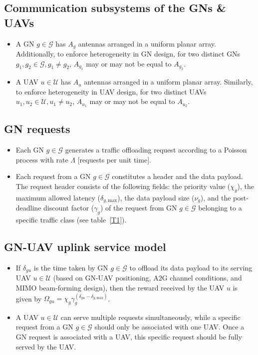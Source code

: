 \documentclass{article}
\begin{document}
\subsection{Communication subsystems of the GNs \& UAVs}
\begin{itemize}
    \item A GN $g{\in}\mathcal{G}$ has $A_{g}$ antennas arranged in a uniform planar array. Additionally, to enforce heterogeneity in GN design, for two distinct GNs $g_{1},g_{2}{\in}\mathcal{G},g_{1}{\neq}g_{2}$, $A_{g_{1}}$ may or may not be equal to $A_{g_{2}}$.
    \item A UAV $u{\in}\mathcal{U}$ has $A_{u}$ antennas arranged in a uniform planar array. Similarly, to enforce heterogeneity in UAV design, for two distinct UAVs $u_{1},u_{2}{\in}\mathcal{U},u_{1}{\neq}u_{2}$, $A_{u_{1}}$ may or may not be equal to $A_{u_{2}}$.
\end{itemize}

\subsection{GN requests}
\begin{itemize}
    \item Each GN $g{\in}\mathcal{G}$ generates a traffic offloading request according to a Poisson process with rate $\Lambda$ [requests per unit time].
    \item Each request from a GN $g{\in}\mathcal{G}$ constitutes a header and the data payload. The request header consists of the following fields: the priority value ($\chi_{g}$), the maximum allowed latency ($\delta_{g,\mathrm{max}}$), the data payload size ($\nu_{g}$), and the post-deadline discount factor ($\gamma_{g}$) of the request from GN $g{\in}\mathcal{G}$ belonging to a specific traffic class (see table~\ref{T1}).
\end{itemize}

\subsection{GN-UAV uplink service model}
\begin{itemize}
    \item If $\delta_{gu}$ is the time taken by GN $g{\in}\mathcal{G}$ to offload its data payload to its serving UAV $u{\in}\mathcal{U}$ (based on GN-UAV positioning, A$2$G channel conditions, and MIMO beam-forming design), then the reward received by the UAV $u$ is given by $\Omega_{gu}{=}\chi_{g}\gamma_{g}^{(\delta_{gu}{-}\delta_{g,\mathrm{max}})}$.
    \item A UAV $u{\in}\mathcal{U}$ can serve multiple requests simultaneously, while a specific request from a GN $g{\in}\mathcal{G}$ should only be associated with one UAV. Once a GN request is associated with a UAV, this specific request should be fully served by the UAV.
\end{itemize}
\end{document}

